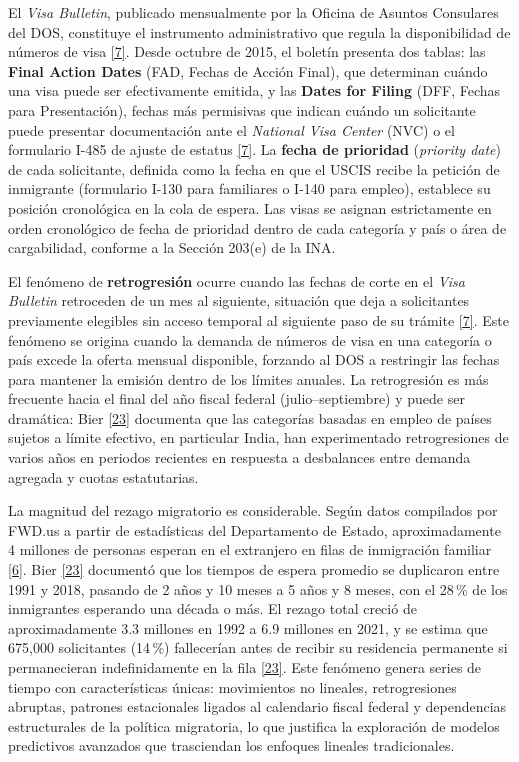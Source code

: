 \documentclass[12pt,letterpaper]{report}
\newcommand{\cita}[1]{\hyperref[bib:#1]{[#1]}}
\begin{document}
El \textit{Visa Bulletin}, publicado mensualmente por la Oficina de Asuntos Consulares del DOS, constituye el instrumento administrativo que regula la disponibilidad de números de visa \cita{7}. Desde octubre de 2015, el boletín presenta dos tablas: las \textbf{Final Action Dates} (FAD, Fechas de Acción Final), que determinan cuándo una visa puede ser efectivamente emitida, y las \textbf{Dates for Filing} (DFF, Fechas para Presentación), fechas más permisivas que indican cuándo un solicitante puede presentar documentación ante el \textit{National Visa Center} (NVC) o el formulario I-485 de ajuste de estatus \cita{7}. La \textbf{fecha de prioridad} (\textit{priority date}) de cada solicitante, definida como la fecha en que el USCIS recibe la petición de inmigrante (formulario I-130 para familiares o I-140 para empleo), establece su posición cronológica en la cola de espera. Las visas se asignan estrictamente en orden cronológico de fecha de prioridad dentro de cada categoría y país o área de cargabilidad, conforme a la Sección 203(e) de la INA.

El fenómeno de \textbf{retrogresión} ocurre cuando las fechas de corte en el \textit{Visa Bulletin} retroceden de un mes al siguiente, situación que deja a solicitantes previamente elegibles sin acceso temporal al siguiente paso de su trámite \cita{7}. Este fenómeno se origina cuando la demanda de números de visa en una categoría o país excede la oferta mensual disponible, forzando al DOS a restringir las fechas para mantener la emisión dentro de los límites anuales. La retrogresión es más frecuente hacia el final del año fiscal federal (julio--septiembre) y puede ser dramática: Bier \cita{23} documenta que las categorías basadas en empleo de países sujetos a límite efectivo, en particular India, han experimentado retrogresiones de varios años en periodos recientes en respuesta a desbalances entre demanda agregada y cuotas estatutarias.

La magnitud del rezago migratorio es considerable. Según datos compilados por FWD.us a partir de estadísticas del Departamento de Estado, aproximadamente 4 millones de personas esperan en el extranjero en filas de inmigración familiar \cita{6}. Bier \cita{23} documentó que los tiempos de espera promedio se duplicaron entre 1991 y 2018, pasando de 2 años y 10 meses a 5 años y 8 meses, con el 28\,\% de los inmigrantes esperando una década o más. El rezago total creció de aproximadamente 3.3 millones en 1992 a 6.9 millones en 2021, y se estima que 675,000 solicitantes (14\,\%) fallecerían antes de recibir su residencia permanente si permanecieran indefinidamente en la fila \cita{23}. Este fenómeno genera series de tiempo con características únicas: movimientos no lineales, retrogresiones abruptas, patrones estacionales ligados al calendario fiscal federal y dependencias estructurales de la política migratoria, lo que justifica la exploración de modelos predictivos avanzados que trasciendan los enfoques lineales tradicionales.
\end{document}
